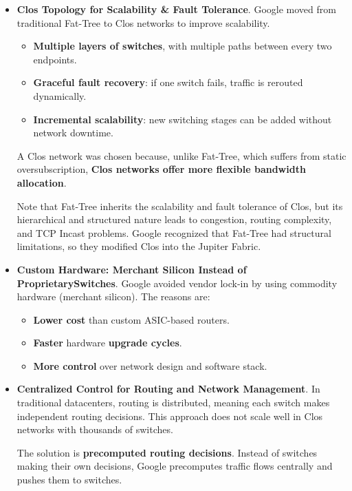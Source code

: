 \begin{itemize}[label=\textcolor{Green3}{}]
    \item \textcolor{Green3}{\textbf{Clos Topology for Scalability \& Fault Tolerance}}. Google moved from traditional Fat-Tree to Clos networks to improve scalability.
    \begin{itemize}
        \item \textbf{Multiple layers of switches}, with multiple paths between every two endpoints.
        \item \textbf{Graceful fault recovery}: if one switch fails, traffic is rerouted dynamically.
        \item \textbf{Incremental scalability}: new switching stages can be added without network downtime.
    \end{itemize}
    A Clos network was chosen because, unlike Fat-Tree, which suffers from static oversubscription, \textbf{Clos networks offer more flexible bandwidth allocation}.

    Note that Fat-Tree inherits the scalability and fault tolerance of Clos, but its hierarchical and structured nature leads to congestion, routing complexity, and TCP Incast problems. Google recognized that Fat-Tree had structural limitations, so they modified Clos into the Jupiter Fabric.

    \item \textcolor{Green3}{\textbf{Custom Hardware: Merchant Silicon Instead of Proprietary\break Switches}}. Google avoided vendor lock-in by using commodity hardware (merchant silicon). The reasons are:
    \begin{itemize}
        \item \textbf{Lower cost} than custom ASIC-based routers.
        \item \textbf{Faster} hardware \textbf{upgrade cycles}.
        \item \textbf{More control} over network design and software stack.
    \end{itemize}


    \item \textcolor{Green3}{\textbf{Centralized Control for Routing and Network Management}}. In traditional datacenters, routing is distributed, meaning each switch makes independent routing decisions. This approach does not scale well in Clos networks with thousands of switches.

    The solution is \textbf{precomputed routing decisions}. Instead of switches making their own decisions, Google precomputes traffic flows centrally and pushes them to switches.


\end{itemize}
